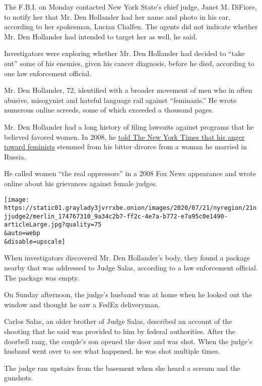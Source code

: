 The F.B.I. on Monday contacted New York State's chief judge, Janet M.
DiFiore, to notify her that Mr. Den Hollander had her name and photo in
his car, according to her spokesman, Lucian Chalfen. The agents did not
indicate whether Mr. Den Hollander had intended to target her as well,
he said.

Investigators were exploring whether Mr. Den Hollander had decided to
``take out'' some of his enemies, given his cancer diagnosis, before he
died, according to one law enforcement official.

Mr. Den Hollander, 72, identified with a broader movement of men who in
often abusive, misogynist and hateful language rail against
``feminazis.'' He wrote numerous online screeds, some of which exceeded
a thousand pages.

Mr. Den Hollander had a long history of filing lawsuits against programs
that he believed favored women. In 2008, he
\href{https://cityroom.blogs.nytimes3xbfgragh.onion/2008/08/18/lawyer-files-antifeminist-suit-against-columbia/\#:~:text=Roy\%20Den\%20Hollander\%20is\%20a,and\%20a\%20self\%2Ddescribed\%20antifeminist.\&text=On\%20Monday\%2C\%20he\%20filed\%20a,sees\%20as\%20discriminatory\%20toward\%20men}{told
The New York Times that his anger toward feminists} stemmed from his
bitter divorce from a woman he married in Russia.

He called women ``the real oppressors'' in a 2008 Fox News appearance
and wrote online about his grievances against female judges.

\texttt{[image: https://static01.graylady3jvrrxbe.onion/images/2020/07/21/nyregion/21njjudge2/merlin\_174767310\_9a34c2b7-ff2c-4e7a-b772-e7a95c0e1490-articleLarge.jpg?quality=75\\\&auto=webp\\\&disable=upscale]}

When investigators discovered Mr. Den Hollander's body, they found a
package nearby that was addressed to Judge Salas, according to a law
enforcement official. The package was empty.

On Sunday afternoon, the judge's husband was at home when he looked out
the window and thought he saw a FedEx deliveryman.

Carlos Salas, an older brother of Judge Salas, described an account of
the shooting that he said was provided to him by federal authorities.
After the doorbell rang, the couple's son opened the door and was shot.
When the judge's husband went over to see what happened, he was shot
multiple times.

The judge ran upstairs from the basement when she heard a scream and the
gunshots.

